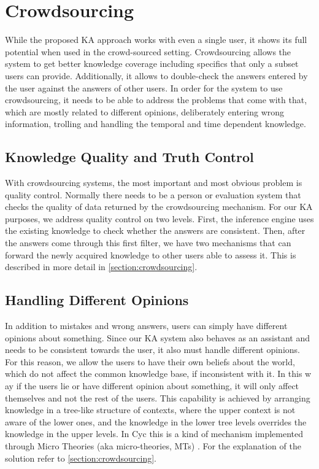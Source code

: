 \section{Crowdsourcing}
\label{section:bg:crowdsourcing}
While the proposed KA approach works with even a single user, it shows its 
full potential when used in the crowd-sourced setting. Crowdsourcing allows 
the system to get better knowledge coverage including specifics that only a 
subset users can provide. Additionally, it allows to double-check the answers 
entered by the user against the answers of other users. In order for the system 
to use crowdsourcing, it needs to be able to address the problems that come 
with that, which are mostly related to different opinions, deliberately entering 
wrong information, trolling and handling the temporal and time dependent 
knowledge.

\subsection{Knowledge Quality and Truth Control} 
With crowdsourcing systems, the most important and most obvious problem is 
quality control. Normally there needs to be a person or evaluation system that 
checks the quality of data returned by the crowdsourcing mechanism. For our 
KA purposes, we address quality control on two levels. First, the inference 
engine uses the existing knowledge to check whether the answers are consistent. 
Then, after the answers come through this first filter, we have two mechanisms 
that can forward the newly acquired knowledge to other users able to assess it. 
This is described in more detail in \autoref{section:crowdsourcing}.

\subsection{Handling Different Opinions}
In addition to mistakes and wrong answers, users can simply have different 
opinions about something. Since our KA system also behaves as an assistant and 
needs to be consistent towards the user, it also must handle different opinions. 
For this reason, we allow the users to have their own beliefs about the world, 
which do not affect the common knowledge base, if inconsistent with it. In this w
ay if the users lie or have different opinion about something, it will only 
affect themselves and not the rest of the users. This capability is achieved by 
arranging knowledge in a tree-like structure of contexts, where the upper 
context is not aware of the lower ones, and the knowledge in the lower tree 
levels overrides the knowledge in the upper levels. In Cyc this is a kind of 
mechanism implemented through Micro Theories (aka micro-theories, MTs)
\parencite{Kleer2013}. For the explanation of the solution refer to 
\autoref{section:crowdsourcing}. 

